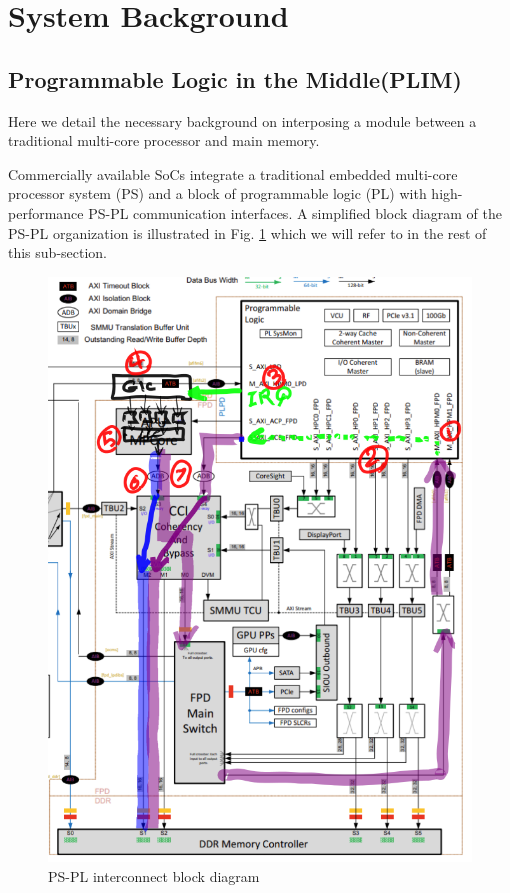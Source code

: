 \section{System Background}
  \subsection{Programmable Logic in the Middle(PLIM)}
    Here we detail the necessary background on interposing a module between a traditional multi-core processor and main memory.

    Commercially available SoCs integrate a traditional embedded multi-core processor system (PS) and a block of programmable logic (PL) with high-performance PS-PL communication interfaces. A simplified block diagram of the PS-PL organization is  illustrated in Fig. \ref{fig:PS-PL-diagram} which we will refer to in the rest of this sub-section.
    
    \begin{figure}[ht!]
      \centering
      \includegraphics[scale=0.4]{images/ps-pl-interconnect.png}
      \caption{PS-PL interconnect block diagram}
      \label{fig:PS-PL-diagram}
    \end{figure}

